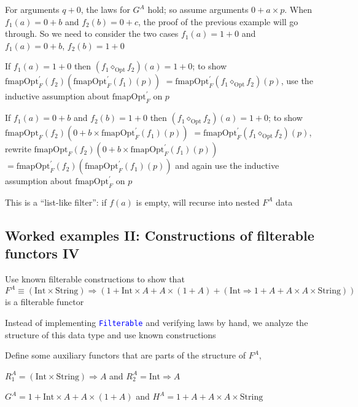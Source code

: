{\footnotesize{}For arguments $q+0$, the laws for $G^{A}$ hold;
so assume arguments $0+a\times p$. When $f_{1}(a)=0+b$ and $f_{2}(b)=0+c$,
the proof of the previous example will go through. So we need to consider
the two cases $f_{1}(a)=1+0$ and $f_{1}(a)=0+b$, $f_{2}(b)=1+0$ }{\footnotesize\par}

{\footnotesize{}If $f_{1}(a)=1+0$ then $(f_{1}\diamond_{\text{Opt}}f_{2})(a)=1+0$;
to show $\text{fmapOpt}_{F}^{\prime}(f_{2})(\text{fmapOpt}_{F}^{\prime}(f_{1})(p))$
$=\text{fmapOpt}_{F}^{\prime}(f_{1}\diamond_{\text{Opt}}f_{2})(p)$,
use the inductive assumption about $\text{fmapOpt}_{F}^{\prime}$
on $p$}{\footnotesize\par}

{\footnotesize{}If $f_{1}(a)=0+b$ and $f_{2}(b)=1+0$ then $(f_{1}\diamond_{\text{Opt}}f_{2})(a)=1+0$;
to show $\text{fmapOpt}_{F}(f_{2})(0+b\times\text{fmapOpt}_{F}^{\prime}(f_{1})(p))$
$=\text{fmapOpt}_{F}^{\prime}(f_{1}\diamond_{\text{Opt}}f_{2})(p)$,
rewrite $\text{fmapOpt}_{F}(f_{2})(0+b\times\text{fmapOpt}_{F}^{\prime}(f_{1})(p))$
$=\text{fmapOpt}_{F}^{\prime}(f_{2})(\text{fmapOpt}_{F}^{\prime}(f_{1})(p))$
and again use the inductive assumption about $\text{fmapOpt}_{F}^{\prime}$
on $p$}{\footnotesize\par}

This is a ``list-like filter'': if $f(a)$ is empty, will recurse
into nested $F^{A}$ data


\subsection{Worked examples II: Constructions of filterable functors IV}

Use known filterable constructions to show that{\footnotesize{} $F^{A}\equiv(\text{Int}\times\text{String})\Rightarrow\left(1+\text{Int}\times A+A\times\left(1+A\right)+\left(\text{Int}\Rightarrow1+A+A\times A\times\text{String}\right)\right)$
}is a filterable functor

Instead of implementing \texttt{\textcolor{blue}{\footnotesize{}Filterable}}
and verifying laws by hand, we analyze the structure of this data
type and use known constructions

Define some auxiliary functors that are parts of the structure of
$F^{A}$,

$R_{1}^{A}=\left(\text{Int}\times\text{String}\right)\Rightarrow A$
and $R_{2}^{A}=\text{Int}\Rightarrow A$ 

$G^{A}=1+\text{Int}\times A+A\times\left(1+A\right)$ and $H^{A}=1+A+A\times A\times\text{String}$


